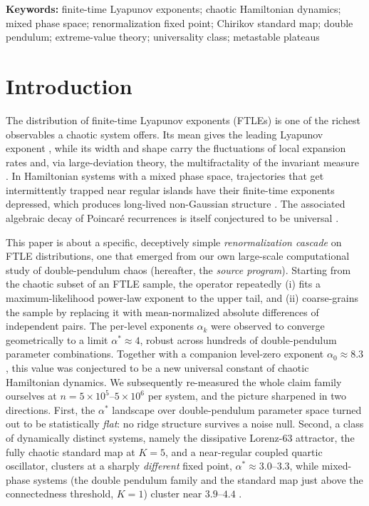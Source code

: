 \documentclass[11pt,a4paper]{article}
\theoremstyle{remark}
\begin{document}
\vspace{4pt}\noindent\textbf{Keywords:} finite-time Lyapunov exponents; chaotic Hamiltonian dynamics;
mixed phase space; renormalization fixed point; Chirikov standard map; double pendulum; extreme-value
theory; universality class; metastable plateaus

\tableofcontents

\section{Introduction}\label{sec:intro}

The distribution of finite-time Lyapunov exponents (FTLEs) is one of the richest observables a
chaotic system offers. Its mean gives the leading Lyapunov exponent \cite{oseledec,benettin}, while
its width and shape carry the fluctuations of local expansion rates and, via large-deviation theory,
the multifractality of the invariant measure \cite{grassberger,prasad,pikovsky,ott}. In Hamiltonian
systems with a mixed phase space, trajectories that get intermittently trapped near regular islands
have their finite-time exponents depressed, which produces long-lived non-Gaussian structure
\cite{zaslavsky,meiss}. The associated algebraic decay of Poincar\'e recurrences is itself conjectured
to be universal \cite{chirikovshep,cristadoro}.

This paper is about a specific, deceptively simple \emph{renormalization cascade} on FTLE
distributions, one that emerged from our own large-scale computational study of double-pendulum chaos
\cite{shinbrot,stachowiakNote} (hereafter, the \emph{source program}). Starting from the chaotic
subset of an FTLE sample, the operator repeatedly (i) fits a maximum-likelihood power-law exponent to
the upper tail, and (ii) coarse-grains the sample by replacing it with mean-normalized absolute
differences of independent pairs. The per-level exponents $\alpha_k$ were observed to converge
geometrically to a limit $\alpha^*\!\approx\!4$, robust across hundreds of double-pendulum parameter
combinations. Together with a companion level-zero exponent $\alpha_0\!\approx\!8.3$, this value was
conjectured to be a new universal constant of chaotic Hamiltonian dynamics. We subsequently
re-measured the whole claim family ourselves at $n=5\times10^{5}$--$5\times10^{6}$ per system, and the
picture sharpened in two directions. First, the $\alpha^*$ landscape over double-pendulum parameter
space turned out to be statistically \emph{flat}: no ridge structure survives a noise null. Second, a
class of dynamically distinct systems, namely the dissipative Lorenz-63 attractor, the fully chaotic
standard map at $K=5$, and a near-regular coupled quartic oscillator, clusters at a sharply
\emph{different} fixed point, $\alpha^*\!\approx\!3.0$--$3.3$, while mixed-phase systems (the double
pendulum family and the standard map just above the connectedness threshold, $K=1$) cluster near
$3.9$--$4.4$ \cite{note-registry}.
\end{document}
